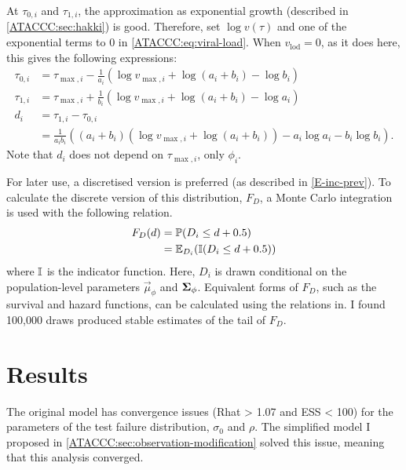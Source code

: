 \documentclass[thesis.tex]{subfiles}
\begin{document}
At $\tau_{0,i}$ and $\tau_{1,i}$, the approximation as exponential growth (described in \cref{ATACCC:sec:hakki}) is good.
Therefore, set $\log v(\tau)$ and one of the exponential terms to 0 in \cref{ATACCC:eq:viral-load}.
When $v_\text{lod} = 0$, as it does here, this gives the following expressions:
$$
\begin{aligned}
\tau_{0,i}
&= \tau_{\max,i} - \frac{1}{a_i} \left(\log v_{\max,i} + \log(a_i + b_i) - \log b_i \right) \\
\tau_{1,i}
&= \tau_{\max,i} + \frac{1}{b_i} \left(\log v_{\max,i} + \log(a_i + b_i) - \log a_i \right) \\
d_i
&= \tau_{1,i} - \tau_{0,i}  \\
&= \frac{1}{a_i b_i} \left( (a_i + b_i) (\log v_{\max,i} + \log(a_i + b_i)) - a_i \log a_i - b_i \log b_i \right).
\end{aligned}
$$
Note that $d_i$ does not depend on $\tau_{\max,i}$, only $\phi_i$.

For later use, a discretised version is preferred (as described in \cref{E-inc-prev}).
To calculate the discrete version of this distribution, $F_D$, a Monte Carlo integration is used with the following relation.
\begin{align}
  F_D(d)
  &= \operatorname{\mathbb{P}}(D_i \leq d + 0.5) \\
  &= \operatorname{\mathbb{E}}_{D_i}(\operatorname{\mathbb{I}}(D_i \leq d + 0.5)) 
\end{align}
where $\operatorname{\mathbb{I}}$ is the indicator function.
Here, $D_i$ is drawn conditional on the population-level parameters $\vec{\mu}_\phi$ and $\bm{\Sigma}_\phi$.
Equivalent forms of $F_D$, such as the survival and hazard functions, can be calculated using the relations in.
I found 100,000 draws produced stable estimates of the tail of $F_D$.

\section{Results} \label{ATACCC:sec:results-discussion}

The original \textcite{hakkiOnset} model has convergence issues (Rhat > 1.07 and ESS < 100) for the parameters of the test failure distribution, $\sigma_0$ and $\rho$.
The simplified model I proposed in \cref{ATACCC:sec:observation-modification} solved this issue, meaning that this analysis converged.
\end{document}
